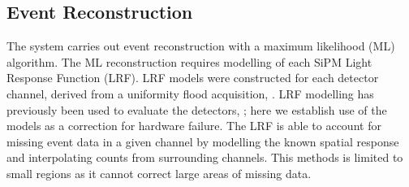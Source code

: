 \subsection{Event Reconstruction}
The system carries out event reconstruction with a maximum likelihood (ML) algorithm. The ML reconstruction requires modelling of each SiPM Light Response Function (LRF). LRF models were constructed for each detector channel, derived from a uniformity flood acquisition, \cite{6359814}. LRF modelling has previously been used to evaluate the detectors, \cite{8069405}; here we establish use of the models as a correction for hardware failure. The LRF is able to account for missing event data in a given channel by modelling the known spatial response and interpolating counts from surrounding channels. This methods is limited to small regions as it cannot correct large areas of missing data. 